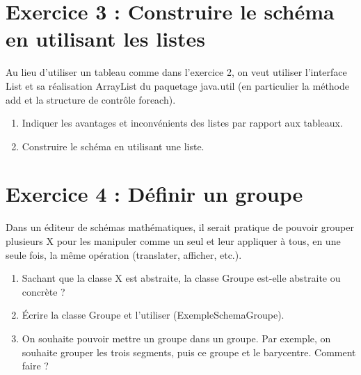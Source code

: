 \documentclass[
]{article}
\begin{document}
\hypertarget{exercice-3-construire-le-schuxe9ma-en-utilisant-les-listes}{%
\section{Exercice 3 : Construire le schéma en utilisant les
listes}\label{exercice-3-construire-le-schuxe9ma-en-utilisant-les-listes}}

Au lieu d'utiliser un tableau comme dans l'exercice 2, on veut utiliser
l'interface List et sa réalisation ArrayList du paquetage java.util (en
particulier la méthode add et la structure de contrôle foreach).

\begin{enumerate}
\def\labelenumi{\arabic{enumi}.}
\item
  Indiquer les avantages et inconvénients des listes par rapport aux
  tableaux.
\item
  Construire le schéma en utilisant une liste.
\end{enumerate}

\hypertarget{exercice-4-duxe9finir-un-groupe}{%
\section{Exercice 4 : Définir un
groupe}\label{exercice-4-duxe9finir-un-groupe}}

Dans un éditeur de schémas mathématiques, il serait pratique de pouvoir
grouper plusieurs X pour les manipuler comme un seul et leur appliquer à
tous, en une seule fois, la même opération (translater, afficher, etc.).

\begin{enumerate}
\def\labelenumi{\arabic{enumi}.}
\item
  Sachant que la classe X est abstraite, la classe Groupe est-elle
  abstraite ou concrète ?
\item
  Écrire la classe Groupe et l'utiliser (ExempleSchemaGroupe).
\item
  On souhaite pouvoir mettre un groupe dans un groupe. Par exemple, on
  souhaite grouper les trois segments, puis ce groupe et le barycentre.
  Comment faire ?
\end{enumerate}
\end{document}
